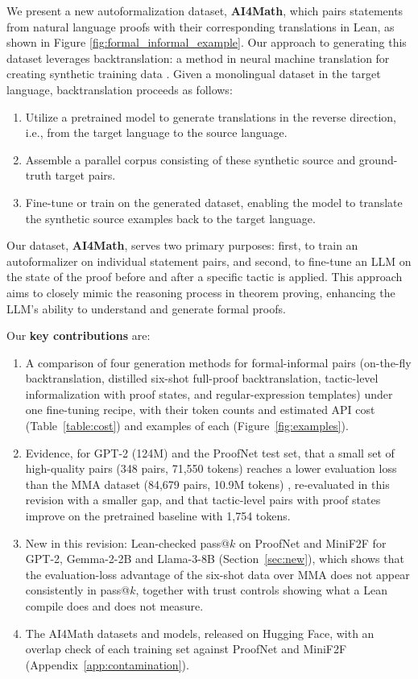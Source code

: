 \documentclass{article} %
\begin{document}
We present a new autoformalization dataset, \textbf{AI4Math}, which pairs statements from natural language proofs with their corresponding translations in Lean, as shown in Figure \ref{fig:formal_informal_example}. Our approach to generating this dataset leverages backtranslation: a method in neural machine translation for creating synthetic training data \citep{liu2021complementarity}. Given a monolingual dataset in the target language, backtranslation proceeds as follows:
\begin{enumerate}
    \item Utilize a pretrained model to generate translations in the reverse direction, i.e., from the target language to the source language.
    \item Assemble a parallel corpus consisting of these synthetic source and ground-truth target pairs.
    \item Fine-tune or train on the generated dataset, enabling the model to translate the synthetic source examples back to the target language.
\end{enumerate}

Our dataset, \textbf{AI4Math}, serves two primary purposes: first, to train an autoformalizer on individual statement pairs, and second, to fine-tune an LLM on the state of the proof before and after a specific tactic is applied. This approach aims to closely mimic the reasoning process in theorem proving, enhancing the LLM's ability to understand and generate formal proofs. 


Our \textbf{key contributions} are:
\begin{enumerate}
    \item A comparison of four generation methods for formal-informal pairs (on-the-fly backtranslation, distilled six-shot full-proof backtranslation, tactic-level informalization with proof states, and regular-expression templates) under one fine-tuning recipe, with their token counts and estimated API cost (Table~\ref{table:cost}) and examples of each (Figure~\ref{fig:examples}).

    \item Evidence, for GPT-2 (124M) and the ProofNet test set, that a small set of high-quality pairs (348 pairs, 71,550 tokens) reaches a lower evaluation loss than the MMA dataset (84,679 pairs, 10.9M tokens) \citep{mma}, re-evaluated in this revision with a smaller gap, and that tactic-level pairs with proof states improve on the pretrained baseline with 1,754 tokens.

    \item New in this revision: Lean-checked pass@$k$ on ProofNet and MiniF2F for GPT-2, Gemma-2-2B and Llama-3-8B (Section~\ref{sec:new}), which shows that the evaluation-loss advantage of the six-shot data over MMA does not appear consistently in pass@$k$, together with trust controls showing what a Lean compile does and does not measure.

    \item The AI4Math datasets and models, released on Hugging Face, with an overlap check of each training set against ProofNet and MiniF2F (Appendix~\ref{app:contamination}).
\end{enumerate}
\end{document}
